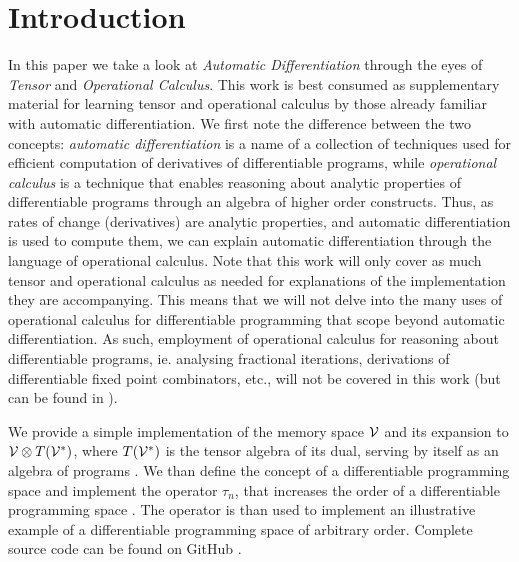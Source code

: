 \section{Introduction}\label{sec:introduction}

In this paper we take a look at \emph{Automatic Differentiation} through the eyes of \emph{Tensor} and \emph{Operational Calculus}. This work is best consumed as supplementary material for learning tensor and operational calculus by those already familiar with automatic differentiation. We first note the difference between the two concepts: \emph{automatic differentiation} is a name of a collection of techniques used for efficient computation of derivatives of differentiable programs, while \emph{operational calculus} is a technique that enables reasoning about analytic properties of differentiable programs through an algebra of higher order constructs. Thus, as rates of change (derivatives) are analytic properties, and automatic differentiation is used to compute them, we can explain automatic differentiation through the language of operational calculus. Note that this work will only cover as much tensor and operational calculus as needed for explanations of the implementation they are accompanying. This means that we will not delve into the many uses of operational calculus for differentiable programming that scope beyond automatic differentiation. As such, employment of operational calculus for reasoning about differentiable programs, ie. analysing fractional iterations, derivations of differentiable fixed point combinators, etc., will not be covered in this work (but can be found in \cite{OperationalCalculus}).

We provide a simple implementation of the memory space $\mathcal{V}$ and its expansion to $\mathcal{V}\otimes T(\mathcal{V}^*)$, where $T(\mathcal{V}^*)$ is the tensor algebra of its dual, serving by itself as an algebra of programs \cite[Definition~4.1]{OperationalCalculus}. We than define the concept of a differentiable programming space and implement the operator $\tau_n$, that increases the order of a differentiable programming space \cite[Proposition~5.1]{OperationalCalculus}. The operator is than used to implement an illustrative example of a differentiable programming space of arbitrary order.
Complete source code can be found on GitHub \cite{dCpp}.
